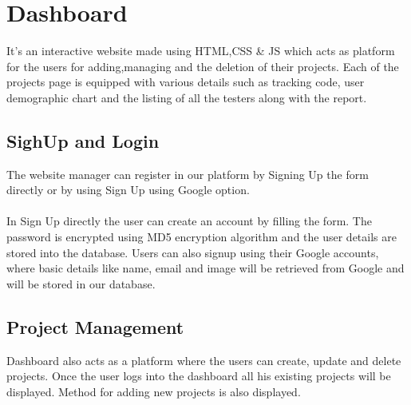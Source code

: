 \documentclass[12pt,a4paper,final]{extreport}
\begin{document}
\section{Dashboard}
It's an interactive website made using HTML,CSS \& JS which acts as platform for the users for adding,managing and the deletion of their projects.
Each of the projects page is equipped with various details such as tracking code, user demographic chart and the listing of all the testers along with the report.

\subsection{SighUp and Login}
The website manager can register in our platform by Signing Up the form directly or by using Sign Up using Google option.
\paragraph{}
In Sign Up directly the user can create an account by filling the form. The password is encrypted using MD5 encryption algorithm and the user details are stored into the database.
Users can also signup using their Google accounts, where basic details like name, email and image will be retrieved from Google and will be stored in our database.

\subsection{Project Management}
Dashboard also acts as a platform where the users can create, update and delete projects. Once the user logs into the dashboard all his existing projects will be displayed. Method for adding new projects is also displayed.
\end{document}

